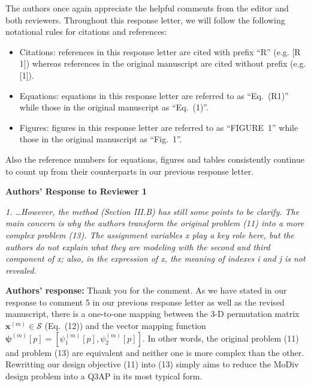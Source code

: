 \documentclass[onecolumn, 11pt, draftclsnofoot]{IEEEtran}
\begin{document}
The authors once again appreciate the helpful comments from the editor and both
reviewers.
Throughout this response letter, we will follow the following notational
rules for citations and references:
\begin{itemize}
  \item Citations: references in this response letter are cited with prefix
  ``R'' (e.g. [R 1]) whereas references in the original manuscript are cited
  without prefix (e.g. [1]).
  \item Equations: equations in this response letter are referred to as
  ``Eq.~(R1)''  while those in the original manuscript as ``Eq.~(1)''.
  \item Figures: figures in this response letter are referred to as
  ``FIGURE~1''  while those in the original manuscript as ``Fig.~1''.
\end{itemize}
Also the reference numbers for equations, figures and tables
consistently continue to count up from their counterparts in our previous
response letter.

\begin{center}
  {\LARGE \textbf{Authors' Response to Reviewer 1}}
\end{center}


 
\noindent
\emph{1. \ldots However, the method (Section III.B) has still some points to be
clarify. The main concern is why the authors transform the original problem (11)
into a more complex problem (13). The assignment variables x play a key role
here, but the authors do not explain what they are modeling with the second and
third component of x; also, in the expression of x, the meaning of indexes i and
j is not revealed.}

\noindent \textbf{Authors' response:} 
Thank you for the comment. As we have stated in our response to comment 5 in our
previous response letter as well as the revised manuscript, there is a
one-to-one mapping between the 3-D permutation matrix
$\mathbf{x}^{(m)}\in\mathcal{S}$ (Eq.~(12)) and the vector mapping function
$\bm{\psi}^{(m)}[p] = [\psi_1^{(m)}[p], \psi_2^{(m)}[p]]$. In other words, the
original problem (11) and problem (13) are equivalent and neither one is more
complex than the other. Rewritting our design objective (11) into (13) simply
aims to reduce the MoDiv design problem into a Q3AP in its most typical form.
\end{document}
